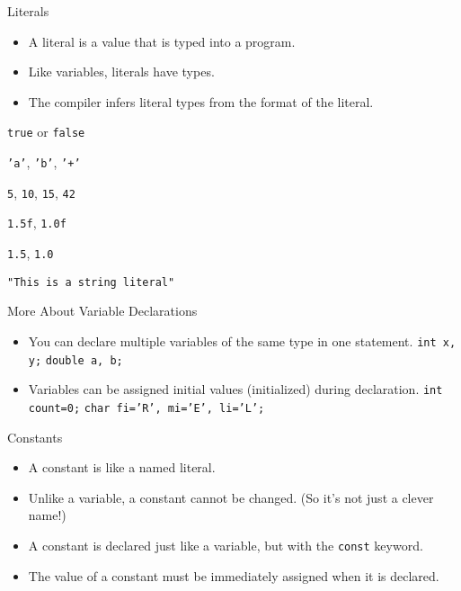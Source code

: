 \documentclass[]{beamer}
\begin{document}
\begin{frame}{Literals}
    \begin{itemize}[<+->]
        \item A literal is a value that is typed into a program.
        \item Like variables, literals have types.
        \item The compiler infers literal types from the format of the
            literal.
    \end{itemize}
    
    \begin{description}[<+->]
        \item[\texttt{bool}] \texttt{true} or \texttt{false}
        \item[\texttt{char}] \texttt{'a'}, \texttt{'b'}, \texttt{'+'}
        \item[\texttt{int}] \texttt{5}, \texttt{10}, \texttt{15}, \texttt{42}
        \item[\texttt{float}] \texttt{1.5f}, \texttt{1.0f}
        \item[\texttt{double}] \texttt{1.5}, \texttt{1.0}
        \item[string] \texttt{"This is a string literal"}
    \end{description}
\end{frame}


\begin{frame}{More About Variable Declarations}
    \begin{itemize}[<+->]
        \item You can declare multiple variables of the same type in
            one statement.
            \newline\texttt{int x, y;}
            \newline\texttt{double a, b;}
        \item Variables can be assigned initial values (initialized)
            during declaration.
            \newline\texttt{int count=0;}
            \newline\texttt{char fi='R', mi='E', li='L';}
    \end{itemize}
\end{frame}


\begin{frame}{Constants}
    \begin{itemize}[<+->]
        \item A constant is like a named literal.
        \item Unlike a variable, a constant cannot be changed. (So
            it's not just a clever name!)
        \item A constant is declared just like a variable, but with
            the \texttt{const} keyword.
        \item The value of a constant must be immediately assigned
            when it is declared.
    \end{itemize}

\end{frame}
\end{document}
